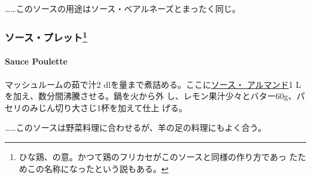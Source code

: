 \begin{recette}
\ldots{}\ldots{}このソースの用途はソース・ベアルネーズとまったく同じ。

\maeaki

\hypertarget{ux30bdux30fcux30b9ux30d7ux30ecux30c3ux30c8109}{%
\subsubsection[ソース・プレット]{\texorpdfstring{ソース・プレット\footnote{ひな鶏、の意。かつて鶏のフリカセがこのソースと同様の作り方であっ
  たためこの名称になったという説もある。}}{ソース・プレット}}\label{ux30bdux30fcux30b9ux30d7ux30ecux30c3ux30c8109}}

\hypertarget{sauce-poulette}{%
\paragraph{Sauce Poulette}\label{sauce-poulette}}


マッシュルームの茹で汁2
dlを\untiers{}量まで煮詰める。ここに\protect\hyperlink{sauce-allemande}{ソース・
アルマンド}1 Lを加え、数分間沸騰させる。鍋を火から外
し、レモン果汁少々とバター60g、パセリのみじん切り大さじ1杯を加えて仕上
げる。

\ldots{}\ldots{}このソースは野菜料理に合わせるが、羊の足の料理にもよく合う。
\end{recette}